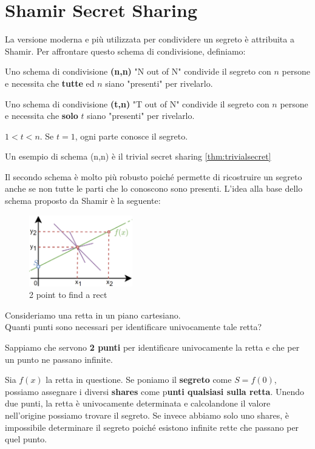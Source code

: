 \section{Shamir Secret Sharing}
La versione moderna e più utilizzata per condividere un segreto è attribuita a Shamir. Per affrontare questo schema di condivisione, definiamo:
\begin{definition}\label{def:noutn}
Uno schema di condivisione \textbf{(n,n)} "N out of N" condivide il segreto con $n$ persone e necessita che \textbf{tutte} ed $n$ siano "presenti" per rivelarlo.
\end{definition}
\begin{definition}\label{def:toutn}
Uno schema di condivisione \textbf{(t,n)} "T out of N" condivide il segreto con $n$ persone e necessita che \textbf{solo} $t$ siano "presenti" per rivelarlo.\\
\begin{remark}
$1<t<n$. Se $t=1$, ogni parte conosce il segreto.
\end{remark}
\end{definition}
\begin{remark}
Un esempio di schema (n,n) è il trivial secret sharing \cref{thm:trivialsecret}
\end{remark}
Il secondo schema è molto più robusto poiché permette di ricostruire un segreto anche se non tutte le parti che lo conoscono sono presenti. L'idea alla base dello schema proposto da Shamir è la seguente:
\begin{figure}[h]
\centering
    \includegraphics[width=0.4\textwidth]{image/secret_sharing/rectfind.png}
    \caption{2 point to find a rect}
    \label{fig:rectfind}
\end{figure}
\begin{example}
Consideriamo una retta in un piano cartesiano. \\Quanti punti sono necessari per identificare univocamente tale retta?
\begin{remark}
Sappiamo che servono \textbf{2 punti} per identificare univocamente la retta e che per un punto ne passano infinite.
\end{remark}
Sia $f(x)$ la retta in questione. Se poniamo il \textbf{segreto} come \textbf{$S=f(0)$}, possiamo assegnare i diversi \textbf{shares} come p\textbf{unti qualsiasi sulla retta}. Unendo due punti, la retta è univocamente determinata e calcolandone il valore nell'origine possiamo trovare il segreto. Se invece abbiamo solo uno shares, è impossibile determinare il segreto poiché esistono infinite rette che passano per quel punto.
\end{example}
